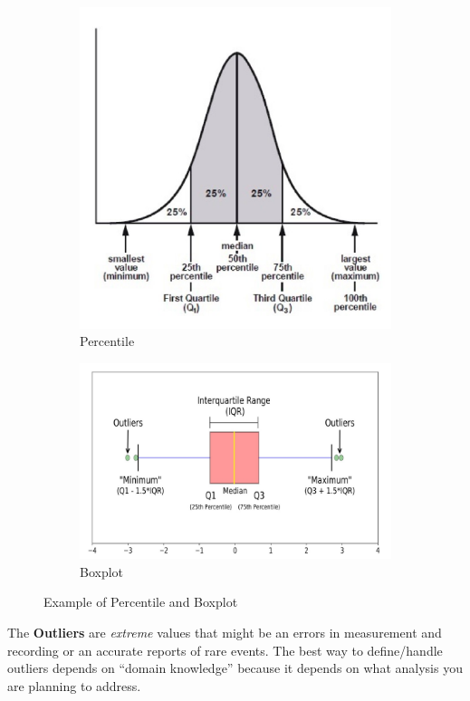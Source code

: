 \begin{figure}[H]
    \begin{subfigure}{.5\textwidth}
        \centering
        \includegraphics[width=.6\linewidth]{images/DataExplVis/Percentile.png}
        \caption{Percentile}
        \label{fig:sub1}
    \end{subfigure}
    \begin{subfigure}{.5 \textwidth}
        \centering
        \includegraphics[width=.8\linewidth]{images/DataExplVis/Boxplot.png}
        \caption{Boxplot}
        \label{fig:sub1}
    \end{subfigure}
    \caption{Example of Percentile and Boxplot}
\end{figure}

The \textbf{Outliers} are \textit{extreme} values that might be an
errors in measurement and recording or an accurate reports of rare
events. The best way to define/handle outliers depends on “domain
knowledge” because it depends on what analysis you are planning to
address.
